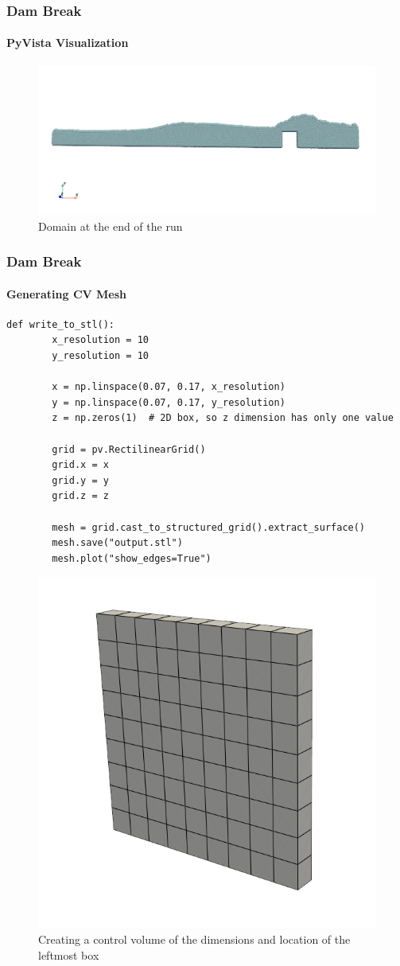 \documentclass[notheorems, aspectratio=169]{beamer}
\begin{document}
  \begin{frame}
    \frametitle{Dam Break}
    \framesubtitle{PyVista Visualization}
    
    \begin{figure}
      \centering
      \includegraphics[width=0.8\linewidth]{pictures/domain_10000.png} 
      \caption{Domain at the end of the run}
    \end{figure}
  
  \end{frame}
 
  
  \begin{frame}[fragile]
    \frametitle{Dam Break}
    \framesubtitle{Generating CV Mesh}
    
    \begin{lstlisting}[style = python]
      def write_to_stl():
        x_resolution = 10
        y_resolution = 10
    
        x = np.linspace(0.07, 0.17, x_resolution)
        y = np.linspace(0.07, 0.17, y_resolution)
        z = np.zeros(1)  # 2D box, so z dimension has only one value
    
        grid = pv.RectilinearGrid()
        grid.x = x
        grid.y = y
        grid.z = z
    
        mesh = grid.cast_to_structured_grid().extract_surface()
        mesh.save("output.stl")
        mesh.plot("show_edges=True")
    \end{lstlisting}
    
  \end{frame}
  
  \begin{frame}

    
    \begin{figure}
      \centering
      \includegraphics[width=0.4\linewidth]{pictures/control_volume_2.png} 
      \caption{Creating a control volume of the dimensions and location of the leftmost box}
    \end{figure}
  
  \end{frame}
  
\end{document}
